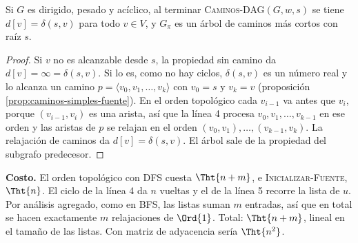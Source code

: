 \documentclass[11pt,letterpaper]{article}
\begin{document}
\begin{teorema}\label{teo:caminos-dag-correccion}
  Si $G$ es dirigido, pesado y acíclico, al terminar
  \textsc{Caminos-DAG}$(G, w, s)$ se tiene $d[v] = \delta(s, v)$ para
  todo $v \in V$, y $G_\pi$ es un árbol de caminos más cortos con raíz
  $s$.
\end{teorema}

\begin{proof}
  Si $v$ no es alcanzable desde $s$, la propiedad sin camino da
  $d[v] = \infty = \delta(s, v)$. Si lo es, como no hay ciclos,
  $\delta(s, v)$ es un número real y lo alcanza un camino
  $p = \langle v_0, v_1, \dots, v_k\rangle$ con $v_0 = s$ y $v_k = v$
  (proposición \ref{prop:caminos-simples-fuente}). En el orden
  topológico cada $v_{i-1}$ va antes que $v_i$, porque
  $(v_{i-1}, v_i)$ es una arista, así que la línea 4 procesa
  $v_0, v_1, \dots, v_{k-1}$ en ese orden y las aristas de $p$ se
  relajan en el orden $(v_0, v_1), \dots, (v_{k-1}, v_k)$. La
  relajación de caminos da $d[v] = \delta(s, v)$. El árbol sale de la
  propiedad del subgrafo predecesor.
\end{proof}

\textbf{Costo.} El orden topológico con DFS cuesta $\Tht{n + m}$, e
\textsc{Inicializar-Fuente}, $\Tht{n}$. El ciclo de la línea 4 da $n$
vueltas y el de la línea 5 recorre la lista de $u$. Por análisis
agregado, como en BFS, las listas suman $m$ entradas, así que en total
se hacen exactamente $m$ relajaciones de $\Ord{1}$. Total:
$\Tht{n + m}$, lineal en el tamaño de las listas. Con matriz de
adyacencia sería $\Tht{n^2}$.
\end{document}
